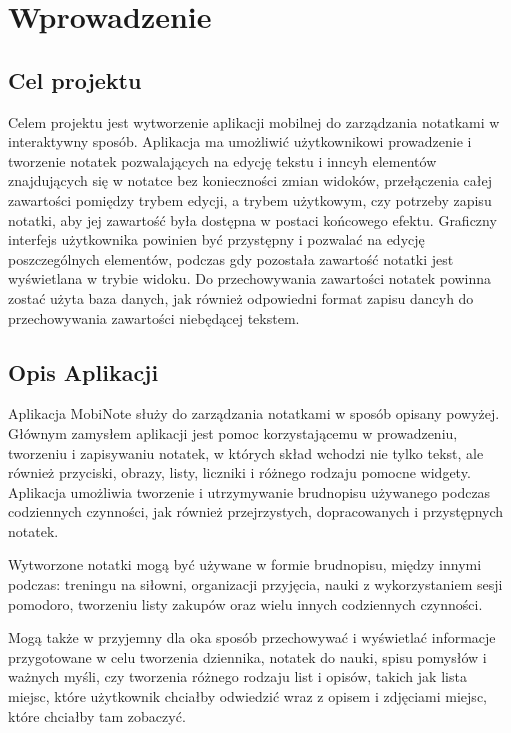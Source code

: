 \documentclass[shortabstract]{iithesis}
\author         {Bartosz Sobocki}
\begin{document}

\chapter{Wprowadzenie}

\section{Cel projektu}

Celem projektu jest wytworzenie aplikacji mobilnej do zarządzania notatkami w interaktywny sposób.
Aplikacja ma umożliwić użytkownikowi prowadzenie i tworzenie notatek pozwalających na edycję tekstu i inncyh elementów znajdujących się w notatce bez konieczności zmian widoków, przełączenia całej zawartości pomiędzy trybem edycji, a trybem użytkowym, czy potrzeby zapisu notatki, aby jej zawartość była dostępna w postaci końcowego efektu.
Graficzny interfejs użytkownika powinien być przystępny i pozwalać na edycję poszczególnych elementów, podczas gdy pozostała zawartość notatki jest wyświetlana w trybie widoku.
Do przechowywania zawartości notatek powinna zostać użyta baza danych, jak również odpowiedni format zapisu dancyh do przechowywania zawartości niebędącej tekstem. 

\section{Opis Aplikacji}

Aplikacja MobiNote służy do zarządzania notatkami w sposób opisany powyżej.
Głównym zamysłem aplikacji jest pomoc korzystającemu w prowadzeniu, tworzeniu i zapisywaniu notatek, w których skład wchodzi nie tylko tekst, ale również przyciski, obrazy, listy, liczniki i różnego rodzaju pomocne widgety.
Aplikacja umożliwia tworzenie i utrzymywanie brudnopisu używanego podczas codziennych czynności, jak również przejrzystych, dopracowanych i przystępnych  notatek.

Wytworzone notatki mogą być używane w formie brudnopisu, między innymi podczas: treningu na siłowni, organizacji przyjęcia, nauki z wykorzystaniem sesji pomodoro, tworzeniu listy zakupów oraz wielu innych codziennych czynności.

Mogą także w przyjemny dla oka sposób przechowywać i wyświetlać informacje przygotowane w celu tworzenia dziennika, notatek do nauki, spisu pomysłów i ważnych myśli, czy tworzenia różnego rodzaju list i opisów, takich jak lista miejsc, które użytkownik chciałby odwiedzić wraz z opisem i zdjęciami miejsc, które chciałby tam zobaczyć.
\end{document}
